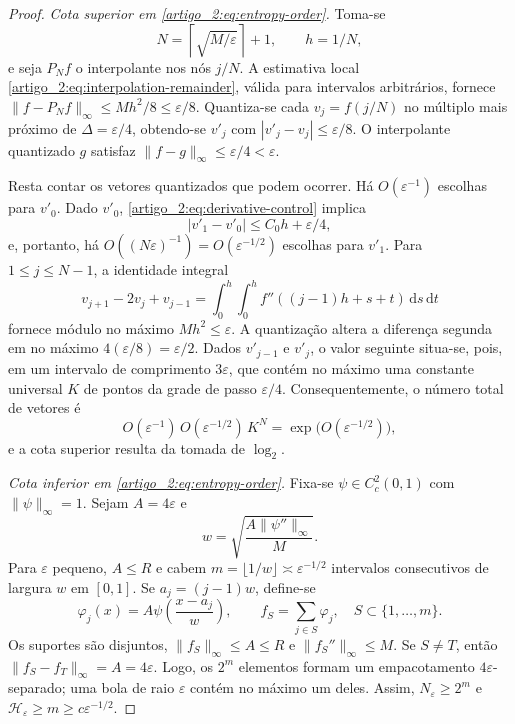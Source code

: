 \documentclass[12pt,a4paper]{article}
\theoremstyle{preciso}
\theoremstyle{definition}
\newcommand{\dd}{\,\mathrm{d}}
\theoremstyle{preciso}
\theoremstyle{preciso}
\theoremstyle{preciso}
\theoremstyle{preciso}
\theoremstyle{definition}
\theoremstyle{preciso}
\theoremstyle{definition}
\theoremstyle{preciso}
\theoremstyle{preciso}
\theoremstyle{definition}
\begin{document}
\begin{proof}
\emph{Cota superior em \eqref{artigo_2:eq:entropy-order}.} Toma-se
\[
 N=\left\lceil\sqrt{M/\varepsilon}\right\rceil+1,\qquad h=1/N,
\]
e seja $P_Nf$ o interpolante nos nós $j/N$. A estimativa local \eqref{artigo_2:eq:interpolation-remainder}, válida para intervalos arbitrários, fornece $\|f-P_Nf\|_\infty\le Mh^2/8\le\varepsilon/8$. Quantiza-se cada $v_j=f(j/N)$ no múltiplo mais próximo de $\Delta=\varepsilon/4$, obtendo-se $v'_j$ com $|v'_j-v_j|\le\varepsilon/8$. O interpolante quantizado $g$ satisfaz $\|f-g\|_\infty\le\varepsilon/4<\varepsilon$.

Resta contar os vetores quantizados que podem ocorrer. Há $O(\varepsilon^{-1})$ escolhas para $v'_0$. Dado $v'_0$, \eqref{artigo_2:eq:derivative-control} implica
\[
 |v'_1-v'_0|\le C_0h+\varepsilon/4,
\]
e, portanto, há $O((N\varepsilon)^{-1})=O(\varepsilon^{-1/2})$ escolhas para $v'_1$. Para $1\le j\le N-1$, a identidade integral
\[
 v_{j+1}-2v_j+v_{j-1}
 =\int_0^h\int_0^h
 f''((j-1)h+s+t)\dd s\dd t
\]
fornece módulo no máximo $Mh^2\le\varepsilon$. A quantização altera a diferença segunda em no máximo $4(\varepsilon/8)=\varepsilon/2$. Dados $v'_{j-1}$ e $v'_j$, o valor seguinte situa-se, pois, em um intervalo de comprimento $3\varepsilon$, que contém no máximo uma constante universal $K$ de pontos da grade de passo $\varepsilon/4$. Consequentemente, o número total de vetores é
\[
 O(\varepsilon^{-1})\,O(\varepsilon^{-1/2})\,K^N
 =\exp\bigl(O(\varepsilon^{-1/2})\bigr),
\]
e a cota superior resulta da tomada de $\log_2$.

\emph{Cota inferior em \eqref{artigo_2:eq:entropy-order}.} Fixa-se $\psi\in C_c^2(0,1)$ com $\|\psi\|_\infty=1$. Sejam $A=4\varepsilon$ e
\[
 w=\sqrt{\frac{A\|\psi''\|_\infty}{M}}.
\]
Para $\varepsilon$ pequeno, $A\le R$ e cabem $m=\lfloor1/w\rfloor\asymp\varepsilon^{-1/2}$ intervalos consecutivos de largura $w$ em $[0,1]$. Se $a_j=(j-1)w$, define-se
\[
 \varphi_j(x)=A\psi\!\left(\frac{x-a_j}{w}\right),\qquad
 f_S=\sum_{j\in S}\varphi_j,\quad S\subset\{1,\ldots,m\}.
\]
Os suportes são disjuntos, $\|f_S\|_\infty\le A\le R$ e $\|f_S''\|_\infty\le M$. Se $S\neq T$, então $\|f_S-f_T\|_\infty=A=4\varepsilon$. Logo, os $2^m$ elementos formam um empacotamento $4\varepsilon$-separado; uma bola de raio $\varepsilon$ contém no máximo um deles. Assim, $N_\varepsilon\ge2^m$ e $\mathcal{H}_\varepsilon\ge m\ge c\varepsilon^{-1/2}$.


\end{proof}
\end{document}
